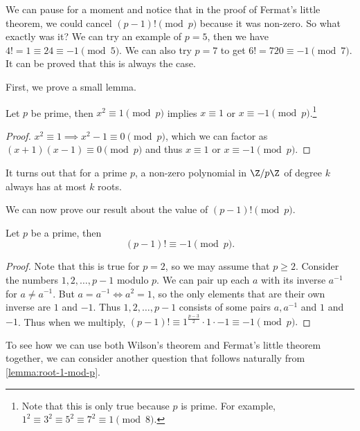 We can pause for a moment and notice that in the proof of Fermat's little theorem, we could cancel $(p - 1)! \pmod{p}$ because it was non-zero. So what exactly was it? We can try an example of $p = 5$, then we have $4! = 1 \equiv 24 \equiv - 1 \pmod{5}$. We can also try $p = 7$ to get $6! = 720 \equiv -1 \pmod{7}$. It can be proved that this is always the case.

First, we prove a small lemma.

\begin{lemma}\label{lemma:root-1-mod-p}
	Let $p$ be prime, then $x^2 \equiv 1 \pmod{p}$ implies $x \equiv 1$ or $x \equiv -1 \pmod{p}$.\footnote{Note that this is only true because $p$ is prime. For example, $1^2 \equiv 3^2 \equiv 5^2 \equiv 7^2 \equiv 1 \pmod{8}$.}
\end{lemma}
\begin{proof}
	$x^2 \equiv 1 \implies x^2 - 1 \equiv 0 \pmod{p}$, which we can factor as $(x + 1)(x - 1) \equiv 0 \pmod{p}$ and thus $x \equiv 1$ or $x \equiv -1 \pmod{p}$.
\end{proof}
\begin{remark}
	It turns out that for a prime $p$, a non-zero polynomial in $\Z/p\Z$ of degree $k$ always has at most $k$ roots.
\end{remark}

We can now prove our result about the value of $(p - 1)! \pmod{p}$.

\begin{theorem}
	Let $p$ be a prime, then
	$$
	(p - 1)! \equiv - 1\pmod{p}.
	$$
\end{theorem}
\begin{proof}
	Note that this is true for $p = 2$, so we may assume that $p \geq 2$. Consider the numbers $1, 2, \dots, p - 1$ modulo $p$. We can pair up each $a$ with its inverse $a^{-1}$ for $a \neq a^{-1}$. But $a = a^{-1} \iff a^2 = 1$, so the only elements that are their own inverse are $1$ and $-1$. Thus $1, 2, \dots, p - 1$ consists of some pairs $a, a^{-1}$ and $1$ and $-1$. Thus when we multiply,
	$
	(p - 1)! \equiv 1^{\frac{p - 3}{2}} \cdot 1 \cdot -1 \equiv -1 \pmod{p}.
	$
\end{proof}

To see how we can use both Wilson's theorem and Fermat's little theorem together, we can consider another question that follows naturally from \autoref{lemma:root-1-mod-p}.

